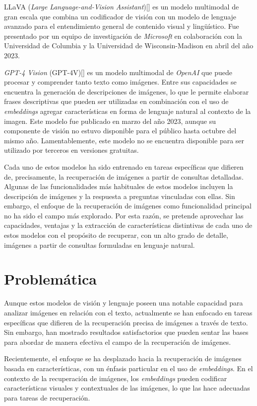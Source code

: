 LLaVA (\textit{Large Language-and-Vision Assistant})[\cite{llava}] es un modelo multimodal de gran escala que combina un codificador de visi\'on con un modelo de lenguaje avanzado para el entendimiento general de contenido visual y lingü\'istico. Fue presentado por un equipo de investigaci\'on de \textit{Microsoft} en colaboraci\'on con la Universidad de Columbia y la Universidad de Wisconsin-Madison en abril del a\~no 2023.

\textit{GPT-4 Vision} (GPT-4V)[\cite{gpt-4v}] es un modelo multimodal de \textit{OpenAI} que puede procesar y comprender tanto texto como imágenes. Entre sus capacidades se encuentra la generación de descripciones de imágenes, lo que le permite elaborar frases descriptivas que pueden ser utilizadas en combinaci\'on con el uso de \textit{embeddings} agregar características en forma de lenguaje natural al contexto de la imagen. Este modelo fue publicado en marzo del a\~no 2023, aunque su componente de visi\'on no estuvo disponible para el p\'ublico hasta octubre del mismo a\~no. Lamentablemente, este modelo no se encuentra disponible para ser utilizado por terceros en versiones gratuitas.

Cada uno de estos modelos ha sido entrenado en tareas específicas que difieren de, precisamente, la recuperación de imágenes a partir de consultas detalladas. Algunas de las funcionalidades más habituales de estos modelos incluyen la descripción de imágenes y la respuesta a preguntas vinculadas con ellas. Sin embargo, el enfoque de la recuperación de imágenes como funcionalidad principal no ha sido el campo más explorado. Por esta razón, se pretende aprovechar las capacidades, ventajas y la extracción de características distintivas de cada uno de estos modelos con el propósito de recuperar, con un alto grado de detalle, imágenes a partir de consultas formuladas en lenguaje natural.

\section*{Problem\'atica}
Aunque estos modelos de visión y lenguaje poseen una notable capacidad para analizar imágenes en relación con el texto, actualmente se han enfocado en tareas específicas que difieren de la recuperación precisa de im\'agenes a trav\'es de texto. Sin embargo, han mostrado resultados satisfactorios que pueden sentar las bases para abordar de manera efectiva el campo de la recuperación de imágenes.

Recientemente, el enfoque se ha desplazado hacia la recuperación de imágenes basada en características, con un énfasis particular en el uso de \textit{embeddings}. En el contexto de la recuperación de imágenes, los \textit{embeddings} pueden codificar características visuales y contextuales de las imágenes, lo que las hace adecuadas para tareas de recuperación.

